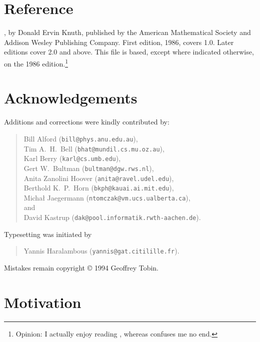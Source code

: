 \section*{Reference}%

\MFbook{}, by Donald Ervin {\sc Knuth}, published by the
American Mathematical Society and Addison Wesley Publishing Company.
First edition, 1986, covers \MF{} 1.0.
Later editions cover \MF{} 2.0 and above.
This file is based, except where indicated otherwise,
on the 1986 edition.\footnote
{Opinion:  I actually enjoy reading \MFbook{},
whereas \TeXbook{} confuses me no end.}


\section*{Acknowledgements}%

Additions and corrections were kindly contributed by:
\begin{quote}
Bill {\sc Alford} ({\tt bill@phys.anu.edu.au}),\\
Tim A.~H.~{\sc Bell} ({\tt bhat@mundil.cs.mu.oz.au}),\\
Karl {\sc Berry} ({\tt karl@cs.umb.edu}),\\
Gert W.~{\sc Bultman} ({\tt bultman@dgw.rws.nl}),\\
Anita {\sc Zanolini Hoover} ({\tt anita@ravel.udel.edu}),\\
Berthold K.~P.~{\sc Horn} ({\tt bkph@kauai.ai.mit.edu}),\\
Micha{\l} {\sc Jaegermann} ({\tt ntomczak@vm.ucs.ualberta.ca}),\\
\hspace*{4em}and\\
David {\sc Kastrup} ({\tt dak@pool.informatik.rwth-aachen.de}).
\end{quote}

Typesetting was initiated by
\begin{quote}
Yannis {\sc Haralambous} ({\tt yannis@gat.citilille.fr}).
\end{quote}

Mistakes remain copyright \copyright{} 1994 Geoffrey {\sc Tobin}.


\section*{Motivation}%

